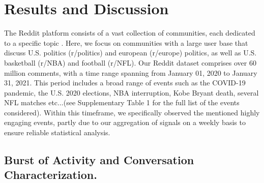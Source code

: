 \documentclass[fleqn,10pt]{wlscirep}
\begin{document}
\section*{Results and Discussion}
The Reddit platform consists of a vast collection of communities,
each dedicated to a specific topic \cite{olson2015navigating}.
Here, we focus on communities with a large user base that discuss U.S. politics (r/politics) and european (r/europe) politics, as well as U.S. basketball (r/NBA) and football (r/NFL). 
Our Reddit dataset comprises over 60 million comments, with a time range spanning from January 01, 2020 to January 31, 2021. 
This period includes a broad range of events such as the COVID-19 pandemic, the U.S. 2020 elections, NBA interruption, Kobe Bryant death, several NFL matches etc...(see Supplementary Table 1 for the full list of the events considered).
Within this timeframe, we specifically observed the mentioned highly engaging events, partly due to our aggregation of signals on a weekly basis to ensure reliable statistical analysis.
%
\subsection*{Burst of Activity and Conversation Characterization.}
\end{document}
